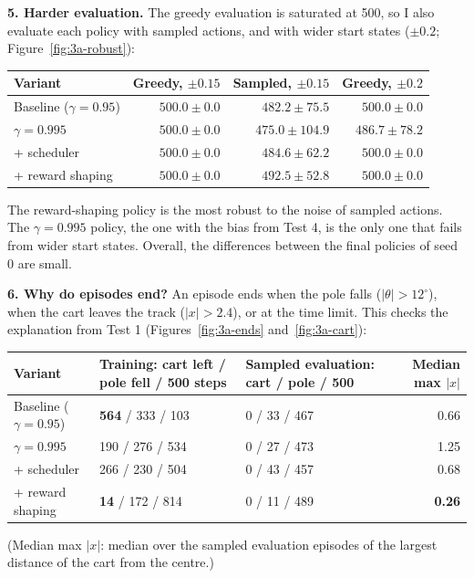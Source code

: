 
\textbf{5. Harder evaluation.} The greedy evaluation is saturated at 500, so I also evaluate each policy with sampled actions, and with wider start states ($\pm 0.2$; Figure~\ref{fig:3a-robust}):

\begin{center}
\small
\begin{tabular}{@{}lrrr@{}}
  \toprule
  \textbf{Variant} & \textbf{Greedy, $\pm 0.15$} & \textbf{Sampled, $\pm 0.15$} & \textbf{Greedy, $\pm 0.2$} \\
  \midrule
  Baseline ($\gamma = 0.95$) & $500.0 \pm 0.0$ & $482.2 \pm 75.5$ & $500.0 \pm 0.0$ \\
  $\gamma = 0.995$ & $500.0 \pm 0.0$ & $475.0 \pm 104.9$ & $486.7 \pm 78.2$ \\
  + scheduler & $500.0 \pm 0.0$ & $484.6 \pm 62.2$ & $500.0 \pm 0.0$ \\
  + reward shaping & $500.0 \pm 0.0$ & $\mathbf{492.5 \pm 52.8}$ & $500.0 \pm 0.0$ \\
  \bottomrule
\end{tabular}
\end{center}


The reward-shaping policy is the most robust to the noise of sampled actions. The $\gamma = 0.995$ policy, the one with the bias from Test 4, is the only one that fails from wider start states. Overall, the differences between the final policies of seed 0 are small.

\textbf{6. Why do episodes end?} An episode ends when the pole falls ($|\theta| > 12^\circ$), when the cart leaves the track ($|x| > 2.4$), or at the time limit. This checks the explanation from Test 1 (Figures~\ref{fig:3a-ends} and~\ref{fig:3a-cart}):

\begin{center}
\small
\begin{tabularx}{\textwidth}{@{}lLLr@{}}
  \toprule
  \textbf{Variant} & \textbf{Training: cart left / pole fell / 500 steps} & \textbf{Sampled evaluation: cart / pole / 500} & \textbf{Median max $|x|$} \\
  \midrule
  Baseline ($\gamma = 0.95$) & \textbf{564} / 333 / 103 & 0 / 33 / 467 & 0.66 \\
  $\gamma = 0.995$ & 190 / 276 / 534 & 0 / 27 / 473 & 1.25 \\
  + scheduler & 266 / 230 / 504 & 0 / 43 / 457 & 0.68 \\
  + reward shaping & \textbf{14} / 172 / 814 & 0 / 11 / 489 & \textbf{0.26} \\
  \bottomrule
\end{tabularx}

\footnotesize (Median max $|x|$: median over the sampled evaluation episodes of the largest distance of the cart from the centre.)
\end{center}

